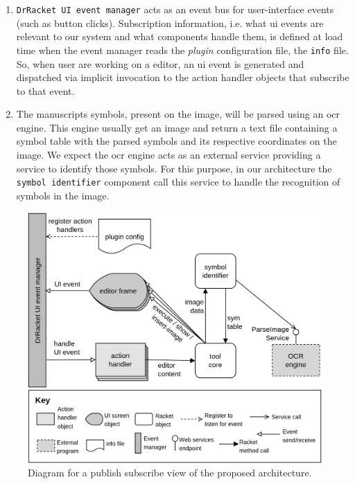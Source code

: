 \begin{enumerate}
	\item \texttt{DrRacket UI event manager} acts as an event bus for user-interface events (such as button clicks). Subscription information, i.e. what \ac{ui} events are relevant to our system and what components handle them, is defined at load time when the event manager reads the \textit{plugin} configuration file, the \texttt{info} file. So, when user are working on a editor, an \ac{ui} event is generated and dispatched via implicit invocation to the action handler objects that subscribe to that event.

	\item The manuscripts symbols, present on the image, will be parsed using an \ac{ocr} engine. This engine usually get an image and return a text file containing a symbol table with the parsed symbols and its respective coordinates on the image. We expect the \ac{ocr} engine acts as an external service providing a service to identify those symbols. For this purpose, in our architecture the \texttt{symbol identifier} component call this service to handle the recognition of symbols in the image.
\end{enumerate}

\begin{figure}[htb]
 \vspace{-15pt}
	\centering
	\includegraphics[scale=0.19]{img/solution}
	\caption{Diagram for a publish subscribe view of the proposed architecture.}
	\label{fig:solution}
 \vspace{-10pt}
\end{figure}

